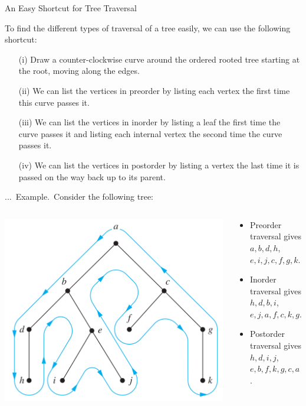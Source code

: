 \documentclass[smaller,hyperref={CJKbookmarks=true}]{beamer}
\newcounter{zhuo}[subsection]
\renewcommand{\thezhuo}{\thesection.\thesubsection.\arabic{zhuo}}
\newenvironment{EXAMPLE}{\stepcounter{zhuo}\alert{\!\thezhuo.~Example.\,}}{}
\begin{document}
\begin{frame}{An Easy Shortcut for Tree Traversal}
\begin{spacing}{1.1}
To find the different types of traversal of a tree easily, we can use the
following shortcut:
\begin{itemize}
  \item[(i)] Draw a counter-clockwise curve around the ordered rooted tree starting at the root, moving along the edges.
  \item[(ii)] We can list the vertices in preorder by listing each vertex the first time this curve passes it.
  \item[(iii)] We can list the vertices in inorder by listing a leaf the first time the curve passes it and listing each internal vertex the second time the curve passes it.
  \item[(iv)] We can list the vertices in postorder by listing a vertex the last time it is passed on the way back up to its parent.
\end{itemize}
\newpage
\vspace*{9pt}
\begin{EXAMPLE}
Consider the following tree:
\begin{columns}[onlytextwidth]
\begin{column}{0.5\textwidth}
\includegraphics[width=\columnwidth]{route2}
\end{column}
\begin{column}{0.5\textwidth}
\begin{itemize}
  \item Preorder traversal gives
  $a,b,d,h$,\\$e,i,j,c,f,g,k$.
  \item Inorder traversal gives
  $h,d,b,i$,\\$e,j,a,f,c,k,g$.
  \item Postorder traversal gives
  $h,d,i,j$,\\$e,b,f,k,g,c,a$.
\end{itemize}
\end{column}
\end{columns}
\end{EXAMPLE}
\end{spacing}
\end{frame}
\end{document}
